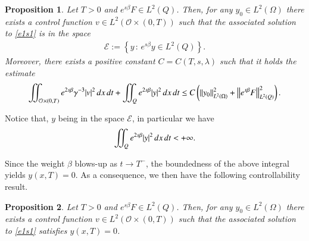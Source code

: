 \documentclass[preprint,1p]{elsarticle}
\newcommand{\norm}[2]{\left\|#1\right\|_{#2}}
\newcommand{\intd}{\displaystyle\int \kern -7pt \int}
\newtheorem{proposition}{\bf Proposition}[section]
\begin{document}
\begin{proposition}\label{control_prop_F}
Let $T>0$ and $e^{s\beta}F\in L^2(Q)$. Then, for any $y_0\in L^2(\Omega)$ there exists a control function $v\in L^2(\mathcal O\times(0,T))$ such that the associated solution to \eqref{e1s1} is in the space
\begin{align*}
	\mathcal E:=\left\{y\,:\,e^{s\beta}y\in L^2(Q)\right\}.
\end{align*}
Moreover, there exists a positive constant $C=C(T,s,\lambda)$ such that it holds the estimate
\begin{align}\label{energy_weight}
	\intd_{\mathcal O\times(0,T)} e^{2s\beta}\gamma^{-3} |v|^2\,dx\,dt + \intd_Q e^{2s\beta}|y|^2\,dx\,dt 
	 \leq C \left(\norm{y_0}{L^2(\Omega)}^2 + \norm{e^{s\beta}F}{L^2(Q)}^2\right).
\end{align}
\end{proposition} 
Notice that, $y$ being in the space $\mathcal E$, in particular we have 
\begin{align*}
	\intd_Q e^{2s\beta}|y|^2\,dx\,dt < +\infty.
\end{align*}

Since the weight $\beta$ blows-up as $t\to T^-$, the boundedness of the above integral yields $y(x,T)=0$. As a consequence, we then have the following controllability result.
\begin{proposition}
Let $T>0$ and $e^{s\beta}F\in L^2(Q)$. Then, for any $y_0\in L^2(\Omega)$ there exists a control function $v\in L^2(\mathcal O\times(0,T))$ such that the associated solution to \eqref{e1s1} satisfies $y(x,T)=0$.
\end{proposition} 
 
\end{document}
